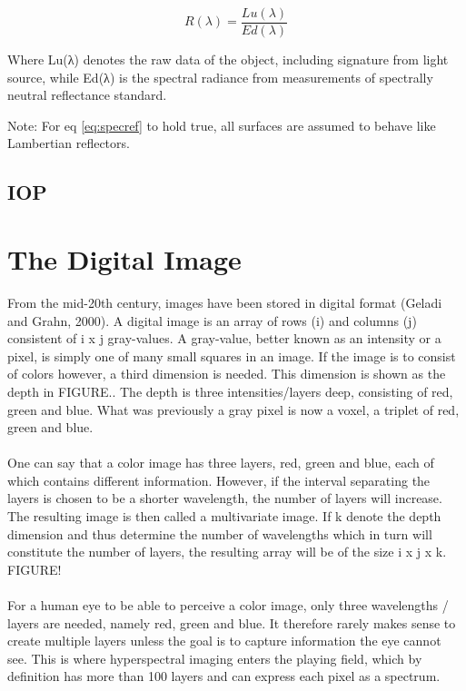 \begin{equation} \label{eq:specref}
    R(\lambda) = \frac{Lu(\lambda)}{Ed(\lambda)}
\end{equation}

Where Lu(λ) denotes the raw data of the object, including signature from light source, while Ed(λ) is the spectral radiance from measurements of spectrally neutral reflectance standard.

Note: For eq \ref{eq:specref} to hold true, all surfaces are assumed to behave like Lambertian reflectors. 

\subsection{IOP}


\section{The Digital Image}

From the mid-20th century, images have been stored in digital format (Geladi and Grahn, 2000). A digital image is an array of rows (i) and columns (j) consistent of i x j gray-values. A gray-value, better known as an intensity or a pixel, is simply one of many small squares in an image. If the image is to consist of colors however, a third dimension is needed. This dimension is shown as the depth in FIGURE.. The depth is three intensities/layers deep, consisting of red, green and blue. What was previously a gray pixel is now a voxel, a triplet of red, green and blue.
\\\\
One can say that a color image has three layers, red, green and blue, each of which contains different information. However, if the interval separating the layers is chosen to be a shorter wavelength, the number of layers will increase. The resulting image is then called a multivariate image. If k denote the depth dimension and thus determine the number of wavelengths which in turn will constitute the number of layers, the resulting array will be of the size i x j x k. FIGURE!
\\\\
For a human eye to be able to perceive a color image, only three wavelengths / layers are needed, namely red, green and blue. It therefore rarely makes sense to create multiple layers unless the goal is to capture information the eye cannot see. This is where hyperspectral imaging enters the playing field, which by definition has more than 100 layers and can express each pixel as a spectrum.

